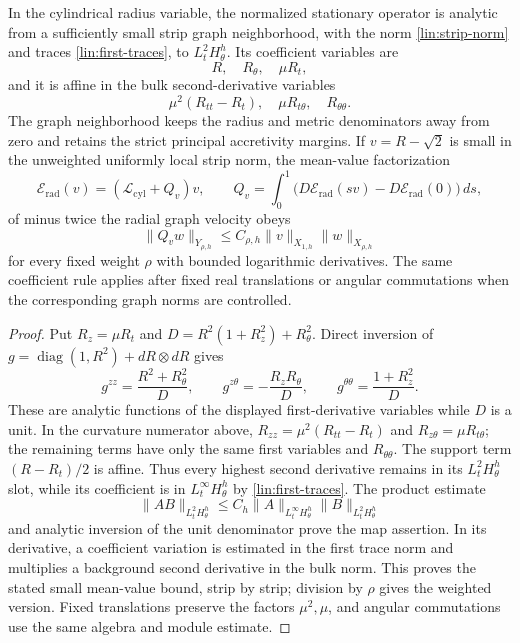 \begin{lemma}\label{gauge:radial}
In the cylindrical radius variable, the normalized stationary operator
is analytic from a sufficiently small strip graph neighborhood, with
the norm \eqref{lin:strip-norm} and traces \eqref{lin:first-traces},
to $L^2_tH^h_\theta$.  Its coefficient variables are
\[
 R,\quad R_\theta,\quad \mu R_t,
\]
and it is affine in the bulk second-derivative variables
\[
 \mu^2(R_{tt}-R_t),\quad \mu R_{t\theta},\quad
 R_{\theta\theta}.
\]
The graph neighborhood keeps the radius and metric denominators away
from zero and retains the strict principal accretivity margins.
If $v=R-\sqrt2$ is small in the unweighted uniformly local strip norm,
the mean-value factorization
\[
 \mathcal E_{\mathrm{rad}}(v)
 =(\mathcal L_{\mathrm{cyl}}+Q_v)v,\qquad
 Q_v=\int_0^1\!\bigl(D\mathcal E_{\mathrm{rad}}(sv)-D\mathcal E_{\mathrm{rad}}(0)\bigr)\,ds,
\]
of minus twice the radial graph velocity obeys
\[
 \|Q_v w\|_{Y_{\rho,h}}
 \le C_{\rho,h}\|v\|_{X_{1,h}}\|w\|_{X_{\rho,h}}
\]
for every fixed weight $\rho$ with bounded logarithmic derivatives.
The same coefficient rule applies after fixed real translations or
angular commutations when the corresponding graph norms are controlled.
\end{lemma}

\begin{proof}
Put $R_z=\mu R_t$ and
$D=R^2(1+R_z^2)+R_\theta^2$.  Direct inversion of
$g=\operatorname{diag}(1,R^2)+dR\otimes dR$ gives
\[
 g^{zz}=\frac{R^2+R_\theta^2}{D},\qquad
 g^{z\theta}=-\frac{R_zR_\theta}{D},\qquad
 g^{\theta\theta}=\frac{1+R_z^2}{D}.
\]
These are analytic functions of the displayed first-derivative
variables while $D$ is a unit.  In the curvature numerator above,
$R_{zz}=\mu^2(R_{tt}-R_t)$ and
$R_{z\theta}=\mu R_{t\theta}$; the remaining terms have only the
same first variables and $R_{\theta\theta}$.  The support term
$(R-R_t)/2$ is affine.  Thus every highest second derivative remains
in its $L^2_tH^h_\theta$ slot, while its coefficient is in
$L^\infty_tH^h_\theta$ by \eqref{lin:first-traces}.  The product estimate
\[
 \|AB\|_{L^2_tH^h_\theta}
 \le C_h\|A\|_{L^\infty_tH^h_\theta}
          \|B\|_{L^2_tH^h_\theta}
\]
and analytic inversion of the unit denominator prove the map assertion.
In its derivative, a coefficient variation is estimated in the first
trace norm and multiplies a background second derivative in the bulk
norm.  This proves the stated small mean-value bound, strip by strip;
division by $\rho$ gives the weighted version.  Fixed translations
preserve the factors $\mu^2,\mu$, and angular commutations use the
same algebra and module estimate.
\end{proof}

